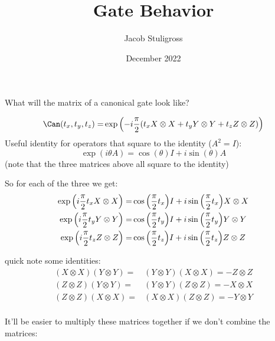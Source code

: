 \documentclass{article}
\title{Gate Behavior}
\author{Jacob Stuligross}
\date{December 2022}
\begin{document}
\maketitle

What will the matrix of a canonical gate look like?

\begin{align*}
  \Can(t_x,t_y,t_z) =& \exp\pqty{-i\frac{\pi}{2}\pqty{t_x X\otimes X + t_y Y\otimes Y + t_z Z\otimes Z}} \\
\end{align*}
Useful identity for operators that square to the identity ($A^2 = I$):
$$
\exp(i\theta A) = \cos(\theta) I + i\sin(\theta) A
$$
(note that the three matrices above all square to the identity)

So for each of the three we get:
\begin{align*}
  \exp\pqty{i\frac{\pi}{2}t_x X\otimes X} =& \cos\pqty{\frac{\pi}{2}t_x} I + i\sin\pqty{\frac{\pi}{2}t_x} X\otimes X \\
  \exp\pqty{i\frac{\pi}{2}t_y Y\otimes Y} =& \cos\pqty{\frac{\pi}{2}t_y} I + i\sin\pqty{\frac{\pi}{2}t_y} Y\otimes Y \\
  \exp\pqty{i\frac{\pi}{2}t_z Z\otimes Z} =& \cos\pqty{\frac{\pi}{2}t_z} I + i\sin\pqty{\frac{\pi}{2}t_z} Z\otimes Z \\
\end{align*}

quick note some identities:
\begin{align*}
  (X\otimes X)(Y\otimes Y) =& (Y\otimes Y)(X\otimes X) = -Z\otimes Z \\
  (Z\otimes Z)(Y\otimes Y) =& (Y\otimes Y)(Z\otimes Z) = -X\otimes X \\
  (Z\otimes Z)(X\otimes X) =& (X\otimes X)(Z\otimes Z) = -Y\otimes Y \\
\end{align*}

It'll be easier to multiply these matrices together if we don't combine the matrices:
\end{document}
